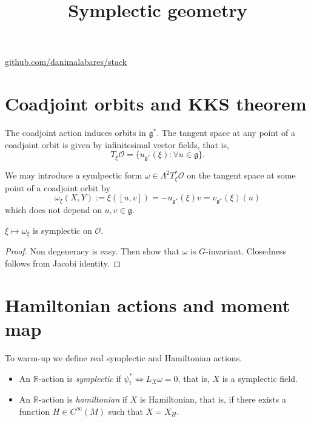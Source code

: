 



\title{Symplectic geometry}
\maketitle

\label{section-phantom}
\hfill
\href{http://github.com/danimalabares/stack}{github.com/danimalabares/stack}

\tableofcontents

\section{Coadjoint orbits and KKS theorem}
\label{section-coadjoint-orbits}

\noindent
The coadjoint action induces orbits in $\mathfrak{g}^*$.
The tangent space at any point of a
coadjoint orbit is given by infinitesimal vector
fields, that is,
$$
T_{\xi}\mathcal{O}=\{u_{\mathfrak{g}^*}(\xi):\forall u \in \mathfrak{g}\}.
$$

\noindent
We may introduce a symlpectic form
$\omega \in \Lambda^{2}T^*_\xi\mathcal{O}$
on the tangent space 
at some point of a
coadjoint orbit by
$$
\omega_\xi(X,Y):=\xi([u,v])=-u_{\mathfrak{g}^*}(\xi)v=v_{\mathfrak{g}^*}(\xi)(u)
$$
which does not depend on $u,v \in \mathfrak{g}$.

\begin{theorem}[KKS]
\label{theorem-KKS}
$\xi \mapsto  \omega_\xi$ is symplectic on $\mathcal{O}$.
\end{theorem}

\begin{proof}
Non degeneracy is easy.
Then show that $\omega$ is $G$-invariant.
Closedness follows from Jacobi identity.
\end{proof}

\section{Hamiltonian actions and moment map}
\label{section-hamiltonian-actions-and-moment-map}

\noindent
To warm-up we define real symplectic and Hamiltonian actions.

\begin{definition}
\label{definition-real-symplectic-and-hamiltonian-actions}
\begin{itemize}
\item An $\mathbb{R}$-action is {\it symplectic} if $\psi_t^* \iff L_X \omega=0$,
that is, $X$ is a symplectic field.
\item An $\mathbb{R}$-action is {\it hamiltonian} if $X$ is Hamiltonian,
that is, if there exists a function $H \in C^\infty(M)$ such that
$X=X_H$.
\end{itemize}
\end{definition}

